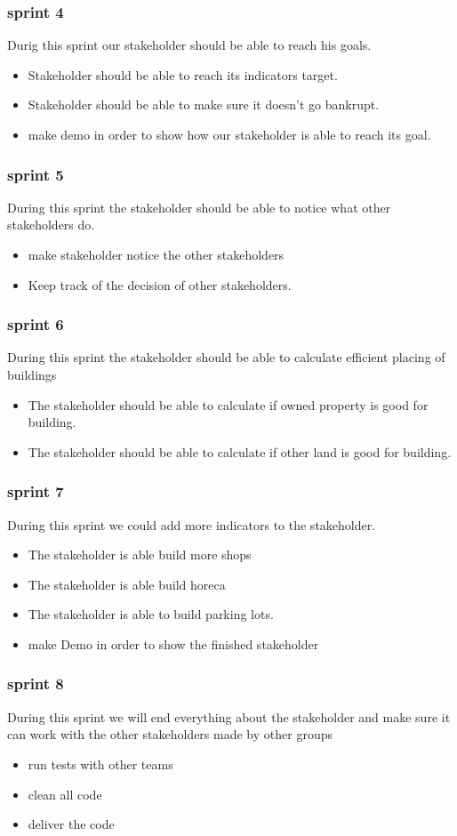 \subsubsection{sprint 4}
Durig this sprint our stakeholder should be able to reach his goals.
\begin{itemize}
	\item Stakeholder should be able to reach its indicators target.
	\item Stakeholder should be able to make sure it doesn't go bankrupt.
	\item make demo in order to show how our stakeholder is able to reach its goal.
\end{itemize} 

\subsubsection{sprint 5}
During this sprint the stakeholder should be able to notice what other stakeholders do.
\begin{itemize}
	\item make stakeholder notice the other stakeholders
	\item Keep track of the decision of other stakeholders.
\end{itemize}

\subsubsection{sprint 6}
During this sprint the stakeholder should be able to calculate efficient placing of buildings
\begin{itemize}
	\item The stakeholder should be able to calculate if owned property is good for building.
	\item The stakeholder should be able to calculate if other land is good for building.
\end{itemize}


\subsubsection{sprint 7}
During this sprint we could add more indicators to the stakeholder.
\begin{itemize}
	\item The stakeholder is able build more shops
	\item The stakeholder is able build horeca
	\item The stakeholder is able to build parking lots.
	\item make Demo in order to show the finished stakeholder
\end{itemize}


\subsubsection{sprint 8}
During this sprint we will end everything about the stakeholder and make sure it can work with the other stakeholders made by other groups
\begin{itemize}
	\item run tests with other teams
	\item clean all code
	\item deliver the code
\end{itemize}
